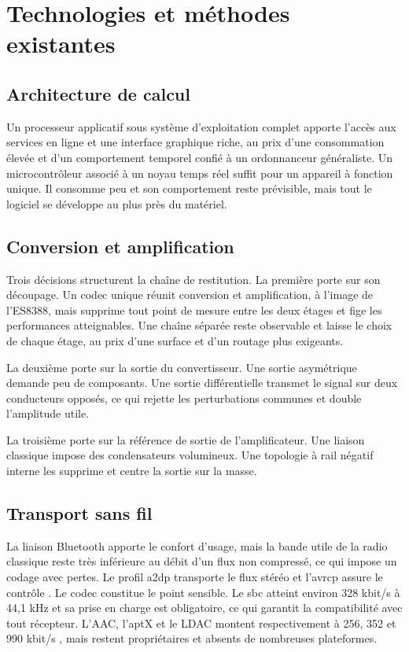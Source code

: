 \section{Technologies et méthodes existantes}

\subsection{Architecture de calcul}

Un processeur applicatif sous système d'exploitation complet apporte l'accès aux services en ligne et une interface graphique riche, au prix d'une consommation élevée et d'un comportement temporel confié à un ordonnanceur généraliste. Un microcontrôleur associé à un noyau temps réel suffit pour un appareil à fonction unique. Il consomme peu et son comportement reste prévisible, mais tout le logiciel se développe au plus près du matériel.

\subsection{Conversion et amplification}

Trois décisions structurent la chaîne de restitution. La première porte sur son découpage. Un codec unique réunit conversion et amplification, à l'image de l'ES8388, mais supprime tout point de mesure entre les deux étages et fige les performances atteignables. Une chaîne séparée reste observable et laisse le choix de chaque étage, au prix d'une surface et d'un routage plus exigeants.

La deuxième porte sur la sortie du convertisseur. Une sortie asymétrique demande peu de composants. Une sortie différentielle transmet le signal sur deux conducteurs opposés, ce qui rejette les perturbations communes et double l'amplitude utile.

La troisième porte sur la référence de sortie de l'amplificateur. Une liaison classique impose des condensateurs volumineux. Une topologie à rail négatif interne les supprime et centre la sortie sur la masse.

\subsection{Transport sans fil}

La liaison Bluetooth apporte le confort d'usage, mais la bande utile de la radio classique reste très inférieure au débit d'un flux non compressé, ce qui impose un codage avec pertes. Le profil \gls{a2dp} transporte le flux stéréo et l'\gls{avrcp} assure le contrôle \cite{bluetooth_sig_a2dp}. Le codec constitue le point sensible. Le \gls{sbc} atteint environ 328 kbit/s à 44,1 kHz et sa prise en charge est obligatoire, ce qui garantit la compatibilité avec tout récepteur. L'AAC, l'aptX et le LDAC montent respectivement à 256, 352 et 990 kbit/s \cite{archimago_bt_codecs}, mais restent propriétaires et absents de nombreuses plateformes.

